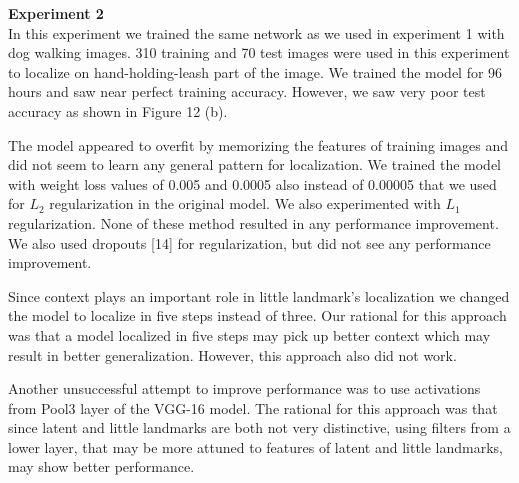 \documentclass [11pt,letterpaper ,twoside ,openany ]{report}
\begin{document}
    \noindent
    \textbf{Experiment 2}\\         
    In this experiment we trained the same network as we used in experiment 1 with dog walking images. 310 training and 70 test images were used in this experiment to localize on hand-holding-leash part of the image. We trained the model for 96 hours and saw near perfect training accuracy. However, we saw very poor test accuracy as shown in Figure 12 (b).

    The model appeared to overfit by memorizing the features of training images and did not seem to learn any general pattern for localization. We trained the model with weight loss values of 0.005 and 0.0005 also instead of 0.00005 that we used for \(L_2\) regularization in the original model. We also experimented with \(L_1\) regularization. None of these method resulted in any performance improvement. We also used dropouts [14] for regularization, but did not see any performance improvement.

    Since context plays an important role in little landmark's localization we changed the model to localize in five steps instead of three. Our rational for this approach was that a model localized in five steps may pick up better context which may result in better generalization. However, this approach also did not work.

    Another unsuccessful attempt to improve performance was to use activations from Pool3 layer of the VGG-16 model. The rational for this approach was that since latent and little landmarks are both not very distinctive, using filters from a lower layer, that may be more attuned to features of latent and little landmarks, may show better performance. \\
\end{document}
